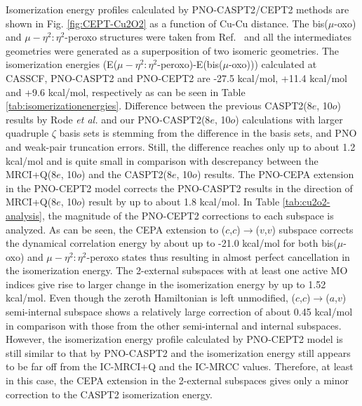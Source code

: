 \documentclass[aip,jcp,amsmath,twocolumn,floatfix,reprint,fleqn]{revtex4-1}
\begin{document}
%
Isomerization energy profiles calculated by PNO-CASPT2/CEPT2 methods are shown in Fig. \ref{fig:CEPT-Cu2O2} as a function of Cu-Cu distance.
%
The bis($\mu$-oxo) and $\mu-\eta^2:\eta^2$-peroxo structures were taken from Ref.~ and all the intermediates geometries were generated as a superposition of two isomeric geometries.
%
The isomerization energies (E($\mu-\eta^2:\eta^2$-peroxo)-E(bis($\mu$-oxo))) calculated at CASSCF, PNO-CASPT2 and PNO-CEPT2 are -27.5 kcal/mol, +11.4 kcal/mol and +9.6 kcal/mol, respectively as can be seen in Table \ref{tab:isomerizationenergies}.
%
Difference between the previous CASPT2(8$e$, 10$o$) results by Rode {\it et al.} and our PNO-CASPT2(8$e$, 10$o$) calculations with larger quadruple $\zeta$ basis sets is stemming from the difference in the basis sets, and PNO and weak-pair truncation errors. 
%
Still, the difference reaches only up to about 1.2 kcal/mol and is quite small in comparison with descrepancy between the MRCI+Q(8$e$, 10$o$) and the CASPT2(8$e$, 10$o$) results.
%
The PNO-CEPA extension in the PNO-CEPT2 model corrects the PNO-CASPT2 results in the direction of MRCI+Q(8$e$, 10$o$) result by up to about 1.8 kcal/mol.
%
In Table \ref{tab:cu2o2-analysis}, the magnitude of the PNO-CEPT2 corrections to each subspace is analyzed.
%
As can be seen, the CEPA extension to ($c$,$c$)$\rightarrow$($v$,$v$) subspace corrects the dynamical correlation energy by about up to -21.0 kcal/mol for both bis($\mu$-oxo) and $\mu-\eta^2:\eta^2$-peroxo states thus resulting in almost perfect cancellation in the isomerization energy.
%
The 2-external subspaces with at least one active MO indices give rise to larger change in the isomerization energy by up to 1.52 kcal/mol.
%
Even though the zeroth Hamiltonian is left unmodified, ($c$,$c$)$\rightarrow$($a$,$v$) semi-internal subspace shows a relatively large correction of about 0.45 kcal/mol in comparison with those from the other semi-internal  and internal subspaces.
%
However, the isomerization energy profile calculated by PNO-CEPT2 model is still similar to that by PNO-CASPT2 and the isomerization energy still appears to be far off from the IC-MRCI+Q and the IC-MRCC values.
%
Therefore, at least in this case, the CEPA extension in the 2-external subspaces gives only a minor correction to the CASPT2 isomerization energy. 
\end{document}
